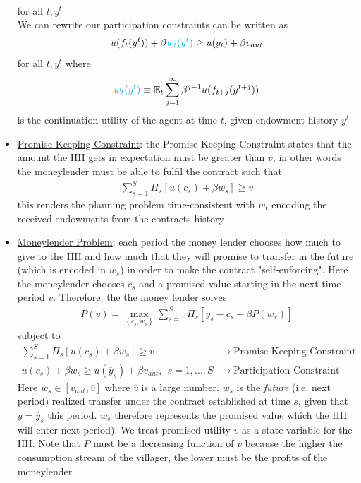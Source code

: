\documentclass{article}
\begin{document}
\begin{itemize}
\begin{gather*}
    \end{gather*}
    for all $t, y^{t}$ \\
    We can rewrite our participation constraints can be written as
    \begin{gather*}
        u(f_{t}(y^{t})) + \beta \begingroup\color{cyan} w_{t}(y^{t}) \endgroup \geq u(y_{t}) + \beta v_{aut}
    \end{gather*}
    for all $t, y^{t}$ where
    \begin{gather*}
        \begingroup\color{cyan} w_{t}(y^{t}) \endgroup \equiv \mathbb{E}_{t} \sum_{j=1}^{\infty} \beta^{j-1} u(f_{t+j} (y^{t+j}))
    \end{gather*}
    is the continuation utility of the agent at time $t$, given endowment history $y^{t}$
    \item  \underline{Promise Keeping Constraint}: the Promise Keeping Constraint states that the amount the HH gets in expectation must be greater than $v$, in other words the moneylender must be able to fulfil the contract such that
    \begin{gather*}
        \sum_{s=1}^{S} \Pi_{s} [u(c_{s}) + \beta w_{s}] \geq v
    \end{gather*}
    this renders the planning problem time-consistent with $w_{t}$ encoding the received endowments from the contracts history
    \item  \underline{Moneylender Problem}: each period the money lender chooses how much to give to the HH and how much that they will promise to transfer in the future (which is encoded in $w_{s}$) in order to make the contract "self-enforcing". Here the moneylender chooses $c_{s}$ and a promised value starting in the next time period $v$. Therefore, the the money lender solves
    \begin{gather*}
        P(v) = \max_{\left\{ c_{s}, w_{s} \right\} } \sum_{s=1}^{S} \Pi_{s} [\overline{y}_{s} - c_{s} + \beta P(w_{s})]
    \end{gather*}
    subject to
    \begin{align*}
        \sum_{s=1}^{S} \Pi_{s} [u(c_{s}) + \beta w_{s}] \geq v & \rightarrow \ \text{Promise Keeping Constraint} \\
        u(c_{s}) + \beta w_{s} \geq u(\overline{y}_{s}) + \beta v_{aut}, \ \ s = 1, \dots, S & \rightarrow \ \text{Participation Constraint}
    \end{align*}
    Here $w_{s} \in [v_{aut}, \overline{v}]$ where $\overline{v}$ is a large number. $w_{s}$ is the \textit{future} (i.e. next period) realized transfer under the contract established at time $s$, given that $y = \overline{y}_{s}$ this period. $w_{s}$ therefore represents the promised value which the HH will enter next period). We treat promised utility $v$ as a state variable for the HH. Note that $P$ must be a decreasing function of $v$ because the higher the consumption stream of the villager, the lower must be the profits of the moneylender

\end{itemize}
\end{document}
